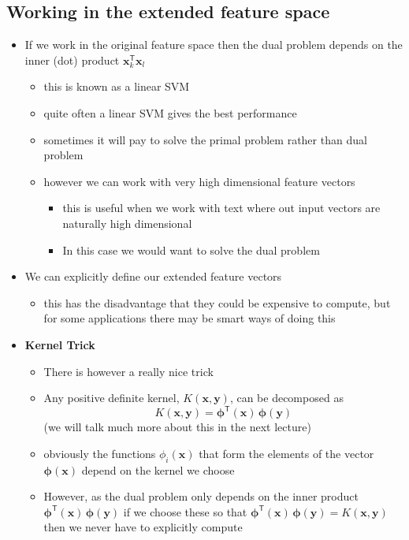 \documentclass[11pt]{article}
\newcommand{\tr}{\textsf{T}}
\begin{document}
\subsection{Working in the extended feature space}
\label{sec:org319ddd7}
\begin{itemize}
\item If we work in the original feature space then the dual problem
depends on the inner (dot) product \(\bm{x}_k^\tr \bm{x}_l\)
\begin{itemize}
\item this is known as a linear SVM
\item quite often a linear SVM gives the best performance
\item sometimes it will pay to solve the primal problem rather than
dual problem
\item however we can work with very high dimensional feature vectors
\begin{itemize}
\item this is useful when we work with text where out input vectors
are naturally high dimensional
\item In this case we would want to solve the dual problem
\end{itemize}
\end{itemize}
\item We can explicitly define our extended feature vectors
\begin{itemize}
\item this has the disadvantage that they could be expensive to
compute, but for some applications there may be smart ways of
doing this
\end{itemize}
\item \textbf{Kernel Trick}
\begin{itemize}
\item There is however a really nice trick
\item Any positive definite kernel, \(K(\bm{x},\bm{y})\), can be
decomposed as
$$ K(\bm{x},\bm{y}) =\bm{\phi}^\tr(\bm{x}) \, \bm{\phi}(\bm{y}) $$ 
(we will talk much more about this in the next lecture)
\item obviously the functions \(\phi_i(\bm{x})\) that form the elements
of the vector \(\bm{\phi}(\bm{x})\) depend on the kernel we choose
\item However, as the dual problem only depends on the inner product
\(\bm{\phi}^\tr(\bm{x}) \, \bm{\phi}(\bm{y})\) if we choose these
so that \(\bm{\phi}^\tr(\bm{x}) \, \bm{\phi}(\bm{y}) =
       K(\bm{x},\bm{y})\) then we never have to explicitly compute

\end{itemize}
\end{itemize}
\end{document}
